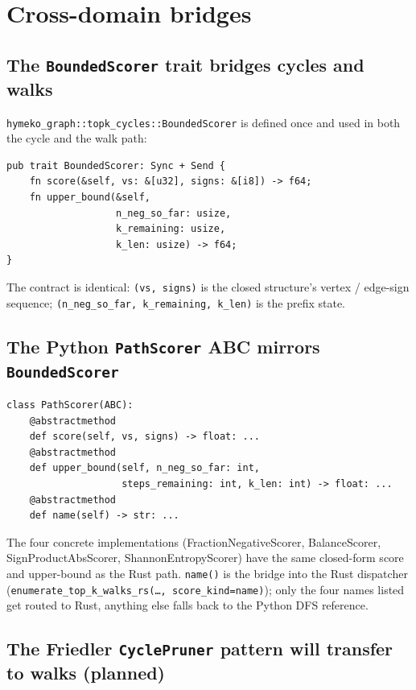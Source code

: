 \documentclass[11pt]{article}
\begin{document}
\section{Cross-domain bridges}

\subsection{The \texttt{BoundedScorer} trait bridges cycles and walks}

\texttt{hymeko\_graph::topk\_cycles::BoundedScorer} is defined once
and used in both the cycle and the walk path:

\begin{lstlisting}[style=ruststyle]
pub trait BoundedScorer: Sync + Send {
    fn score(&self, vs: &[u32], signs: &[i8]) -> f64;
    fn upper_bound(&self,
                   n_neg_so_far: usize,
                   k_remaining: usize,
                   k_len: usize) -> f64;
}
\end{lstlisting}

The contract is identical: \texttt{(vs, signs)} is the closed
structure's vertex / edge-sign sequence; \texttt{(n\_neg\_so\_far,
k\_remaining, k\_len)} is the prefix state.

\subsection{The Python \texttt{PathScorer} ABC mirrors \texttt{BoundedScorer}}

\begin{lstlisting}[style=pythonstyle]
class PathScorer(ABC):
    @abstractmethod
    def score(self, vs, signs) -> float: ...
    @abstractmethod
    def upper_bound(self, n_neg_so_far: int,
                    steps_remaining: int, k_len: int) -> float: ...
    @abstractmethod
    def name(self) -> str: ...
\end{lstlisting}

The four concrete implementations (\textsf{FractionNegativeScorer},
\textsf{BalanceScorer}, \textsf{SignProductAbsScorer},
\textsf{ShannonEntropyScorer}) have the same closed-form score and
upper-bound as the Rust path. \texttt{name()} is the bridge into the
Rust dispatcher (\texttt{enumerate\_top\_k\_walks\_rs(\dots,
score\_kind=name)}); only the four names listed get routed to Rust,
anything else falls back to the Python DFS reference.

\subsection{The Friedler \texttt{CyclePruner} pattern will transfer to walks (planned)}
\end{document}
